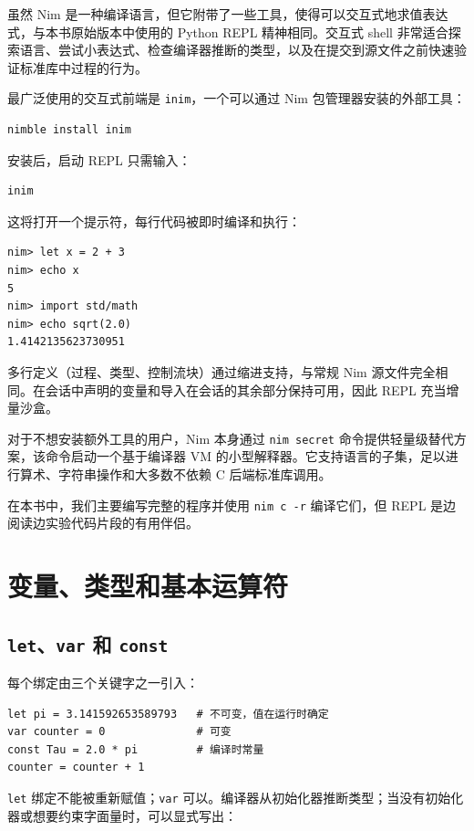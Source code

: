 \documentclass[justified, sixbynine]{tufte-book}
\def\ft{\small\tt}
\theoremstyle{plain}%
\newtheorem * {corollary}{推论}
\theoremstyle{definition}
\theoremstyle{remark}
\newtheorem * {remark}{注记}
\newtheorem * {note}{注释}
\begin{document}
\begin{fullwidth}
虽然 Nim 是一种编译语言，但它附带了一些工具，使得可以交互式地求值表达式，与本书原始版本中使用的 Python REPL 精神相同。交互式 shell 非常适合探索语言、尝试小表达式、检查编译器推断的类型，以及在提交到源文件之前快速验证标准库中过程的行为。

最广泛使用的交互式前端是 {\ft inim}，一个可以通过 Nim 包管理器安装的外部工具：
\begin{lstlisting}
nimble install inim
\end{lstlisting}

安装后，启动 REPL 只需输入：
\begin{lstlisting}
inim
\end{lstlisting}

这将打开一个提示符，每行代码被即时编译和执行：
\begin{lstlisting}
nim> let x = 2 + 3
nim> echo x
5
nim> import std/math
nim> echo sqrt(2.0)
1.4142135623730951
\end{lstlisting}

多行定义（过程、类型、控制流块）通过缩进支持，与常规 Nim 源文件完全相同。在会话中声明的变量和导入在会话的其余部分保持可用，因此 REPL 充当增量沙盒。

对于不想安装额外工具的用户，Nim 本身通过 {\ft nim secret} 命令提供轻量级替代方案，该命令启动一个基于编译器 VM 的小型解释器。它支持语言的子集，足以进行算术、字符串操作和大多数不依赖 C 后端标准库调用。

在本书中，我们主要编写完整的程序并使用 {\ft nim c -r} 编译它们，但 REPL 是边阅读边实验代码片段的有用伴侣。

\goodbreak\section{变量、类型和基本运算符}

\goodbreak\subsection{{\ft let}、{\ft var} 和 {\ft const}}

每个绑定由三个关键字之一引入：

\begin{lstlisting}
let pi = 3.141592653589793   # 不可变，值在运行时确定
var counter = 0              # 可变
const Tau = 2.0 * pi         # 编译时常量
counter = counter + 1
\end{lstlisting}

{\ft let} 绑定不能被重新赋值；{\ft var} 可以。编译器从初始化器推断类型；当没有初始化器或想要约束字面量时，可以显式写出：


\end{fullwidth}
\end{document}
